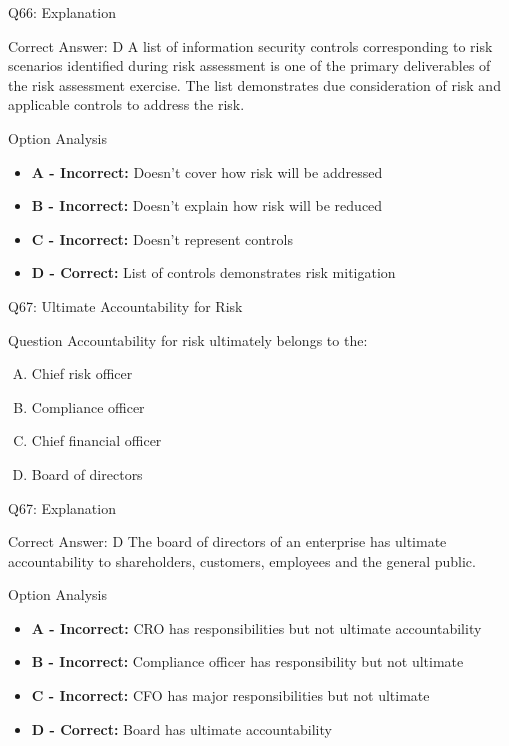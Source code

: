 \documentclass{beamer}
\begin{document}
	\begin{frame}{Q66: Explanation}
		\begin{block}{Correct Answer: D}
			A list of information security controls corresponding to risk scenarios identified during risk assessment is one of the primary deliverables of the risk assessment exercise. The list demonstrates due consideration of risk and applicable controls to address the risk.
		\end{block}
		\begin{block}{Option Analysis}
			\begin{itemize}
				\item \textbf{A - Incorrect:} Doesn't cover how risk will be addressed
				\item \textbf{B - Incorrect:} Doesn't explain how risk will be reduced
				\item \textbf{C - Incorrect:} Doesn't represent controls
				\item \textbf{D - Correct:} List of controls demonstrates risk mitigation
			\end{itemize}
		\end{block}
	\end{frame}
	
	\begin{frame}{Q67: Ultimate Accountability for Risk}
		\begin{block}{Question}
			Accountability for risk ultimately belongs to the:
		\end{block}
		\begin{enumerate}[(A)]
			\item Chief risk officer
			\item Compliance officer
			\item Chief financial officer
			\item Board of directors
		\end{enumerate}
	\end{frame}
	
	\begin{frame}{Q67: Explanation}
		\begin{block}{Correct Answer: D}
			The board of directors of an enterprise has ultimate accountability to shareholders, customers, employees and the general public.
		\end{block}
		\begin{block}{Option Analysis}
			\begin{itemize}
				\item \textbf{A - Incorrect:} CRO has responsibilities but not ultimate accountability
				\item \textbf{B - Incorrect:} Compliance officer has responsibility but not ultimate
				\item \textbf{C - Incorrect:} CFO has major responsibilities but not ultimate
				\item \textbf{D - Correct:} Board has ultimate accountability
			\end{itemize}
		\end{block}
	\end{frame}
	
\end{document}
